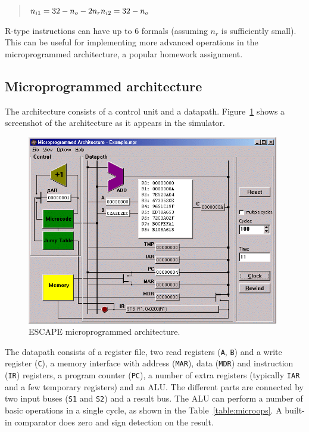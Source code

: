 \documentclass{article}
\begin{document}
\begin{quote}
$
n_{i1} = 32-n_{o}-2n_{r} \\
n_{i2} = 32-n_{o}
$
\end{quote}

R-type instructions can have up to 6 formals (assuming $n_{r}$ is 
sufficiently small). This can be useful for implementing more advanced 
operations in the microprogrammed architecture, a popular homework 
assignment.

\subsection{Microprogrammed architecture}
The architecture consists of a control unit and a datapath. Figure~\ref{fig:micro}
shows a screenshot of the architecture as it appears in the simulator.

\begin{figure}
\centering
\includegraphics[width=11cm]{graphics/micro.png}
\caption{ESCAPE microprogrammed architecture.}
\label{fig:micro}
\end{figure}

The datapath consists of a register file, two read registers (\texttt{A}, \texttt{B}) and a write register (\texttt{C}), a memory interface with address (\texttt{MAR}), data (\texttt{MDR}) and instruction (\texttt{IR}) registers, a program counter (\texttt{PC}), a number of extra registers (typically \texttt{IAR} and a few temporary registers) and an ALU.  The different parts are connected by two input buses (\texttt{S1} and \texttt{S2})
 and a result bus. The ALU can perform a number of basic operations in a
 single cycle, as shown in the Table~\ref{table:microops}. A built-in comparator 
does zero and sign detection on the result.
\end{document}
